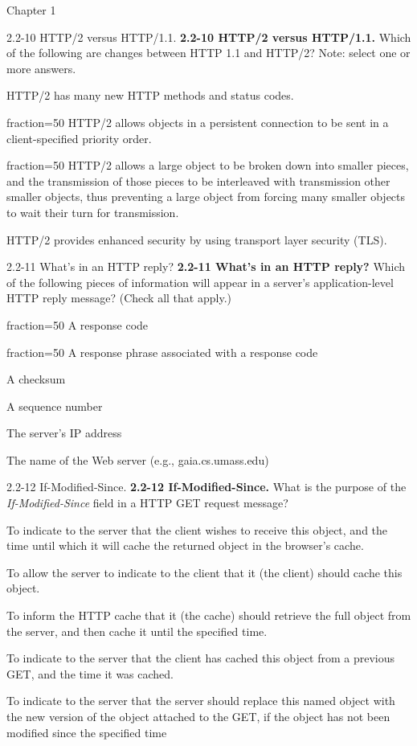 \documentclass[a4paper]{article}
\begin{document}
\begin{quiz}{Chapter 1}
\begin{multi}[points=1,shuffle,multiple]{2.2-10 HTTP/2 versus HTTP/1.1.}
\textbf{2.2-10 HTTP/2 versus HTTP/1.1.}  Which of the following are changes between HTTP 1.1 and HTTP/2? Note: select one or more answers.
\item HTTP/2 has many new HTTP methods and status codes.
\item[fraction=50] HTTP/2 allows objects in a persistent connection to be sent in a client-specified priority order. 
\item[fraction=50] HTTP/2 allows a large object to be broken down into smaller pieces, and the transmission of those pieces to be interleaved with transmission  other smaller objects, thus preventing a large object from forcing many smaller objects to wait their turn for transmission.
\item HTTP/2 provides enhanced security by using transport layer security (TLS).
\end{multi}

\begin{multi}[points=1,shuffle,multiple]{2.2-11 What's in an HTTP reply?}
\textbf{2.2-11 What's in an HTTP reply?} Which of the following pieces of information will appear in a server’s application-level HTTP reply message? (Check all that apply.)
\item[fraction=50] A response code
\item[fraction=50] A response phrase associated with a response code
\item A checksum
\item A sequence number
\item The server's IP address
\item The name of the Web server (e.g., gaia.cs.umass.edu)
\end{multi}

\begin{multi}[points=1,shuffle]{2.2-12 If-Modified-Since.}
\textbf{2.2-12 If-Modified-Since.} What is the purpose of the \emph{If-Modified-Since }field in a HTTP GET request message?
\item To indicate to the server that the client wishes to receive this object, and the time until which it will cache the returned object in the browser's cache.
\item To allow the server to indicate to the client that it (the client) should cache this object.
\item To inform the HTTP cache that it (the cache) should retrieve the full object from the server, and then cache it until the specified time.
\item* To indicate to the server that the client has cached this object from a previous GET, and the time it was cached.
\item To indicate to the server that the server should replace this named object with the new version of the object attached to the GET, if the object has not been modified since the specified time
\end{multi}


\end{quiz}
\end{document}
